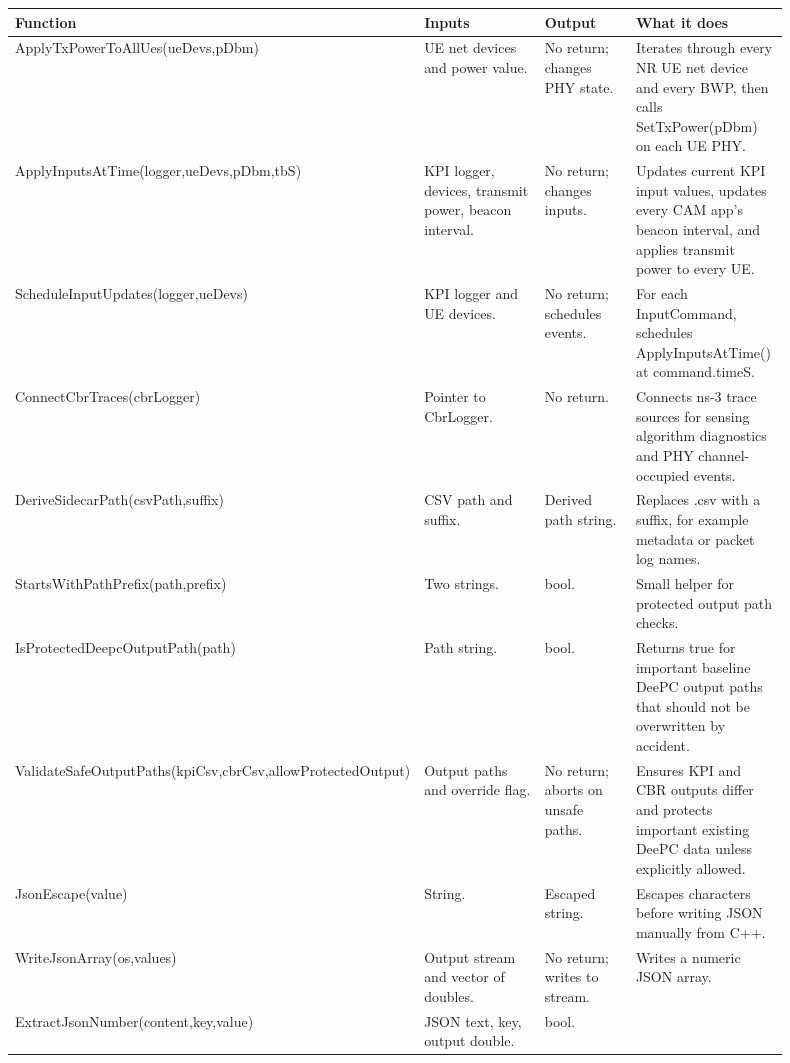 \documentclass[11pt]{article}
\DeclareRobustCommand{\code}[1]{\texttt{\detokenize{#1}}}
\def\code#1{#1}%
\begin{document}
\begin{center}
\begin{longtable}{L{0.24\linewidth}L{0.27\linewidth}L{0.18\linewidth}L{0.21\linewidth}}
\toprule
Function & Inputs & Output & What it does \\
\midrule
\endhead
\code{ApplyTxPowerToAllUes(ueDevs,pDbm)} &
UE net devices and power value. &
No return; changes PHY state. &
Iterates through every NR UE net device and every BWP, then calls
\code{SetTxPower(pDbm)} on each UE PHY. \\
\code{ApplyInputsAtTime(logger,ueDevs,pDbm,tbS)} &
KPI logger, devices, transmit power, beacon interval. &
No return; changes inputs. &
Updates current KPI input values, updates every CAM app's beacon interval, and
applies transmit power to every UE. \\
\code{ScheduleInputUpdates(logger,ueDevs)} &
KPI logger and UE devices. &
No return; schedules events. &
For each \code{InputCommand}, schedules \code{ApplyInputsAtTime()} at
\code{command.timeS}. \\
\code{ConnectCbrTraces(cbrLogger)} &
Pointer to \code{CbrLogger}. &
No return. &
Connects ns-3 trace sources for sensing algorithm diagnostics and PHY
channel-occupied events. \\
\code{DeriveSidecarPath(csvPath,suffix)} &
CSV path and suffix. &
Derived path string. &
Replaces \code{.csv} with a suffix, for example metadata or packet log names. \\
\code{StartsWithPathPrefix(path,prefix)} &
Two strings. &
\code{bool}. &
Small helper for protected output path checks. \\
\code{IsProtectedDeepcOutputPath(path)} &
Path string. &
\code{bool}. &
Returns true for important baseline DeePC output paths that should not be
overwritten by accident. \\
\code{ValidateSafeOutputPaths(kpiCsv,cbrCsv,allowProtectedOutput)} &
Output paths and override flag. &
No return; aborts on unsafe paths. &
Ensures KPI and CBR outputs differ and protects important existing DeePC data
unless explicitly allowed. \\
\code{JsonEscape(value)} &
String. &
Escaped string. &
Escapes characters before writing JSON manually from C++. \\
\code{WriteJsonArray(os,values)} &
Output stream and vector of doubles. &
No return; writes to stream. &
Writes a numeric JSON array. \\
\code{ExtractJsonNumber(content,key,value)} &
JSON text, key, output double. &
\code{bool}. &

\end{longtable}
\end{center}
\end{document}
